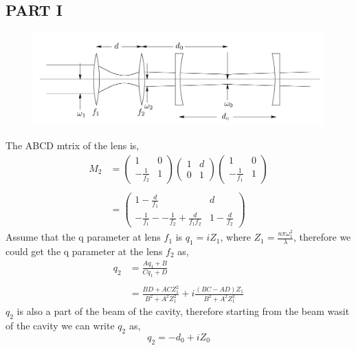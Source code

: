 \documentclass{article}
\begin{document}
\subsection{PART I}
\begin{figure}[h]
	\centering
	\includegraphics[width=0.7\linewidth]{f2}
\end{figure}
The ABCD mtrix of the lens is,
\begin{equation}\label{key}
	\begin{aligned}
			M_2&=
		\begin{pmatrix}
		1 & 0\\
		-\frac{1}{f_2} & 1
		\end{pmatrix}
		\begin{pmatrix}
		1 & d\\
		0 & 1
		\end{pmatrix}
		\begin{pmatrix}
		1 & 0\\
		-\frac{1}{f_1} & 1
		\end{pmatrix}\\
		\\
		&=\begin{pmatrix}
		1-\frac{d}{f_1} & d\\
		-\frac{1}{f_1}--\frac{1}{f_2}+\frac{d}{f_1f_2} & 1-\frac{d}{f_2}
		\end{pmatrix}
	\end{aligned}
\end{equation}
Assume that the q parameter at lens $f_1$ is $q_1=iZ_1$, where $Z_1=\frac{n\pi\omega_1^2}{\lambda}$, therefore we could get the q parameter at the lens $f_2$ as,
\begin{equation}\label{key}
	\begin{aligned}
		q_2&=\frac{Aq_1+B}{Cq_1+D}
		\\
		\\
		&=\frac{BD+ACZ_1^2}{B^2+A^2Z_1^2}+i\frac{(BC-AD)Z_1}{B^2+A^2Z_1^2}
	\end{aligned}
\end{equation}
$q_2$ is also a part of the beam of the cavity, therefore starting from the beam wasit of the cavity we can write $q_2$ as,
\begin{equation}\label{key}
	q_2=-d_0+iZ_0
\end{equation}
\end{document}
